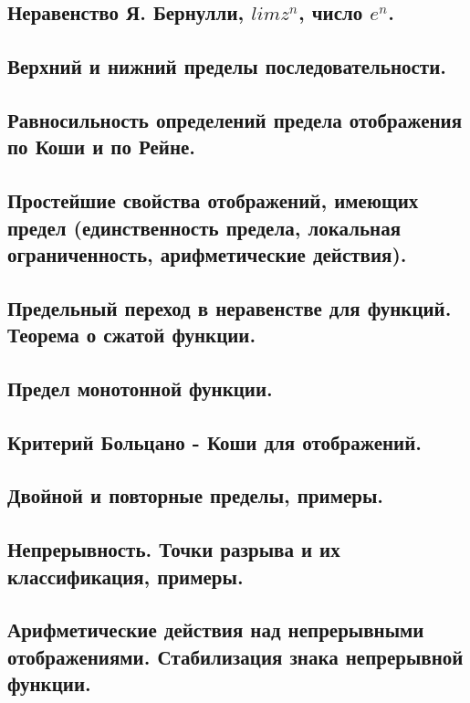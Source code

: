 \documentclass[12pt, a4paper]{article}
\begin{document}
\subsection{Неравенство Я. Бернулли, $lim z^n$, число $e^n$.}

\subsection{Верхний и нижний пределы последовательности.}

\subsection{Равносильность определений предела отображения по Коши и по Рейне.}

\subsection{Простейшие свойства отображений, имеющих предел (единственность предела, локальная ограниченность, арифметические действия).}

\subsection{Предельный переход в неравенстве для функций. Теорема о сжатой функции.}

\subsection{Предел монотонной функции.}

\subsection{Критерий Больцано - Коши для отображений.}

\subsection{Двойной и повторные пределы, примеры.}

\subsection{Непрерывность. Точки разрыва и их классификация, примеры.}

\subsection{Арифметические действия над непрерывными отображениями. Стабилизация знака непрерывной функции.}
\end{document}
